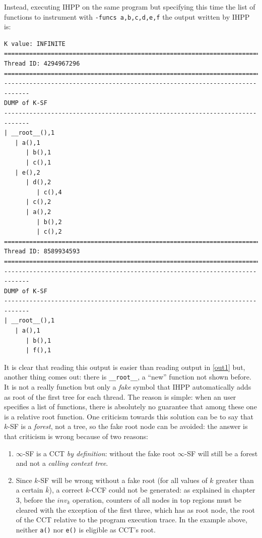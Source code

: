 \documentclass[a4paper,10pt]{report}
\begin{document}
\renewcommand{\labelitemi}{$\bullet$}
\noindent
Instead, executing IHPP on the same program but specifying this time the list 
of functions to instrument with \verb|-funcs a,b,c,d,e,f| the output written by IHPP is:

\begin{lstlisting}[label=out2, 
caption={The output of IHPP run with selective tracing}, frame=bottomline]
K value: INFINITE
=============================================================================
Thread ID: 4294967296
=============================================================================
-----------------------------------------------------------------------------
DUMP of K-SF
-----------------------------------------------------------------------------
| __root__(),1
   | a(),1
      | b(),1
      | c(),1
   | e(),2
      | d(),2
         | c(),4
      | c(),2
      | a(),2
         | b(),2
         | c(),2
=============================================================================
Thread ID: 8589934593
=============================================================================
-----------------------------------------------------------------------------
DUMP of K-SF
-----------------------------------------------------------------------------
| __root__(),1
   | a(),1
      | b(),1
      | f(),1
\end{lstlisting}
\noindent
It is clear that reading this output is easier than reading output in \cref{out1} but,
another thing comes out: there is \verb|__root__|, a ``new'' function not shown before.
It is not a really function but only a \emph{fake} symbol that IHPP automatically adds
as root of the first tree for each thread. The reason is simple: when an user specifies 
a list of functions, there is absolutely no guarantee that among these one is a relative root function.
One criticism towards this solution can be to say that $k$-SF is a \emph{forest}, not a tree, so the fake root node can be avoided: the answer is that criticism is wrong because of two reasons:
\begin{enumerate}
\item $\infty$-SF is a CCT \emph{by definition}: without the fake root $\infty$-SF will still be a forest and not a \emph{calling context tree}. 
\item Since $k$-SF will be wrong without a fake root (for all values of $k$ greater than a certain $\bar{k}$), a correct $k$-CCF could not be generated: as explained in chapter 3, before the $inv_k$ operation, counters of all nodes
in top regions must be cleared with the exception of the first three, which has as root node, the root of the CCT relative to the program execution trace. In the example above,
neither \verb|a()| nor \verb|e()| is eligible as CCT's root.
\end{enumerate}
\end{document}
